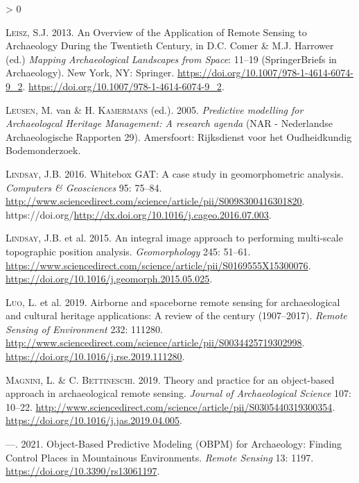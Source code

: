 \documentclass[
  12pt,
]{article}
\newlength{\cslhangindent}
\newenvironment{CSLReferences}[2] %
 {%
  \setlength{\parindent}{0pt}
  \ifodd #1 \everypar{\setlength{\hangindent}{\cslhangindent}}\ignorespaces\fi
  \ifnum #2 > 0
  \setlength{\parskip}{#2\baselineskip}
  \fi
 }%
 {}
\begin{document}
\begin{CSLReferences}{1}{0}
\leavevmode\hypertarget{ref-leiszOverviewApplicationRemote2013a}{}%
\textsc{Leisz}, S.J. 2013. An {Overview} of the {Application} of {Remote} {Sensing} to {Archaeology} {During} the {Twentieth} {Century}, in D.C. Comer \& M.J. Harrower (ed.) \emph{Mapping {Archaeological} {Landscapes} from {Space}}: 11--19 ({SpringerBriefs} in {Archaeology}). New York, NY: Springer. \url{https://doi.org/10.1007/978-1-4614-6074-9_2}. \url{https://doi.org/10.1007/978-1-4614-6074-9_2}.

\leavevmode\hypertarget{ref-vanleusenPredictiveModellingArchaeologcal2005}{}%
\textsc{Leusen}, M. van \& H. \textsc{Kamermans} (ed.). 2005. \emph{Predictive modelling for {Archaeologcal} {Heritage} {Management}: {A} research agenda} ({NAR} - {Nederlandse} {Archaeologische} {Rapporten} 29). Amersfoort: Rijksdienst voor het Oudheidkundig Bodemonderzoek.

\leavevmode\hypertarget{ref-Lindsay2016}{}%
\textsc{Lindsay}, J.B. 2016. Whitebox {GAT}: {A} case study in geomorphometric analysis. \emph{Computers \& Geosciences} 95: 75--84. \url{http://www.sciencedirect.com/science/article/pii/S0098300416301820}. https://doi.org/\url{http://dx.doi.org/10.1016/j.cageo.2016.07.003}.

\leavevmode\hypertarget{ref-lindsayIntegralImageApproach2015}{}%
\textsc{Lindsay}, J.B. et al. 2015. An integral image approach to performing multi-scale topographic position analysis. \emph{Geomorphology} 245: 51--61. \url{https://www.sciencedirect.com/science/article/pii/S0169555X15300076}. \url{https://doi.org/10.1016/j.geomorph.2015.05.025}.

\leavevmode\hypertarget{ref-luoAirborneSpaceborneRemote2019}{}%
\textsc{Luo}, L. et al. 2019. Airborne and spaceborne remote sensing for archaeological and cultural heritage applications: {A} review of the century (1907--2017). \emph{Remote Sensing of Environment} 232: 111280. \url{http://www.sciencedirect.com/science/article/pii/S0034425719302998}. \url{https://doi.org/10.1016/j.rse.2019.111280}.

\leavevmode\hypertarget{ref-magniniTheoryPracticeObjectbased2019}{}%
\textsc{Magnini}, L. \& C. \textsc{Bettineschi}. 2019. Theory and practice for an object-based approach in archaeological remote sensing. \emph{Journal of Archaeological Science} 107: 10--22. \url{http://www.sciencedirect.com/science/article/pii/S0305440319300354}. \url{https://doi.org/10.1016/j.jas.2019.04.005}.

\leavevmode\hypertarget{ref-magniniObjectBasedPredictiveModeling2021a}{}%
---. 2021. Object-{Based} {Predictive} {Modeling} ({OBPM}) for {Archaeology}: {Finding} {Control} {Places} in {Mountainous} {Environments}. \emph{Remote Sensing} 13: 1197. \url{https://doi.org/10.3390/rs13061197}.


\end{CSLReferences}
\end{document}
